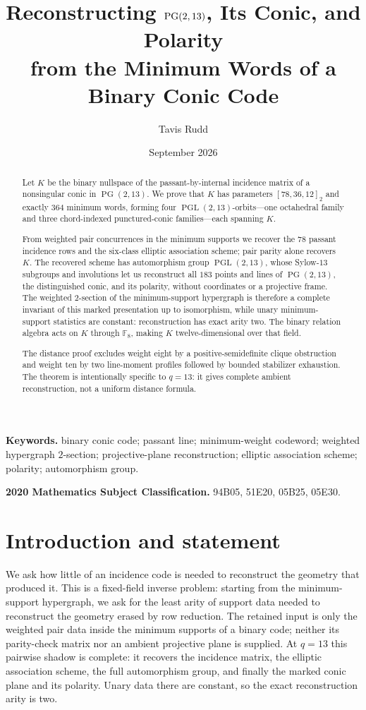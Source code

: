 \documentclass[11pt]{article}
\title{Reconstructing $\PG(2,13)$, Its Conic, and Polarity\\
from the Minimum Words of a Binary Conic Code}
\author{Tavis Rudd}
\date{September 2026}
\theoremstyle{definition}
\theoremstyle{remark}
\newcommand{\F}{\mathbb F}
\newcommand{\PG}{\operatorname{PG}}
\newcommand{\PGL}{\operatorname{PGL}}
\begin{document}
\maketitle

\begin{abstract}
Let \(K\) be the binary nullspace of the passant-by-internal
incidence matrix of a nonsingular conic in \(\PG(2,13)\).  We prove that
\(K\) has parameters \([78,36,12]_2\) and exactly \(364\) minimum words,
forming four \(\PGL(2,13)\)-orbits---one octahedral family and three
chord-indexed punctured-conic families---each spanning \(K\).

From weighted pair concurrences in the minimum supports we recover the \(78\)
passant incidence rows and the six-class elliptic association scheme; pair
parity alone recovers \(K\).  The recovered scheme has automorphism group
\(\PGL(2,13)\), whose Sylow-\(13\) subgroups and involutions let us
reconstruct all \(183\) points and lines of \(\PG(2,13)\), the distinguished
conic, and its polarity, without coordinates or a projective frame.  The
weighted \(2\)-section of the minimum-support hypergraph is therefore a
complete invariant of this marked presentation up to isomorphism, while
unary minimum-support statistics are constant: reconstruction has exact
arity two.  The
binary relation algebra acts on \(K\) through \(\F_8\), making \(K\)
twelve-dimensional over that field.

The distance proof excludes weight eight by a positive-semidefinite clique
obstruction and weight ten by two line-moment profiles followed by bounded
stabilizer
exhaustion.  The theorem is intentionally specific to \(q=13\): it gives
complete ambient reconstruction, not a uniform distance formula.
\end{abstract}

\noindent\textbf{Keywords.} binary conic code; passant line; minimum-weight
codeword; weighted hypergraph \(2\)-section; projective-plane reconstruction;
elliptic association scheme; polarity; automorphism group.

\smallskip
\noindent\textbf{2020 Mathematics Subject Classification.} 94B05, 51E20,
05B25, 05E30.

\section{Introduction and statement}

We ask how little of an incidence code is needed to reconstruct the geometry
that produced it.  This is a fixed-field inverse problem: starting from the
minimum-support hypergraph, we ask for the least arity of support data needed
to reconstruct the geometry erased by row reduction.  The retained input is
only the weighted pair data inside the minimum supports of a binary code;
neither its parity-check matrix nor an ambient projective plane is supplied.
At \(q=13\) this pairwise shadow is complete: it recovers the incidence
matrix, the elliptic association scheme, the full automorphism group, and
finally the marked conic plane and its polarity.  Unary data there are
constant, so the exact reconstruction arity is two.
\end{document}
